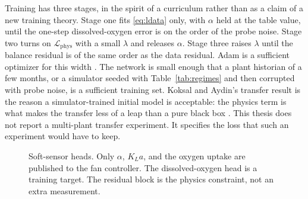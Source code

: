 Training has three stages, in the spirit of a curriculum rather than as a claim of a new training theory. Stage one fits \eqref{eq:ldata} only, with $\alpha$ held at the table value, until the one-step dissolved-oxygen error is on the order of the probe noise. Stage two turns on $\mathcal{L}_{\mathrm{phys}}$ with a small $\lambda$ and releases $\alpha$. Stage three raises $\lambda$ until the balance residual is of the same order as the data residual. Adam is a sufficient optimizer for this width \cite{kingma2015adam,goodfellow2016deep}. The network is small enough that a plant historian of a few months, or a simulator seeded with Table~\ref{tab:regimes} and then corrupted with probe noise, is a sufficient training set. Koksal and Aydin's transfer result is the reason a simulator-trained initial model is acceptable: the physics term is what makes the transfer less of a leap than a pure black box \cite{koksal2024,pan2010transfer}. This thesis does not report a multi-plant transfer experiment. It specifies the loss that such an experiment would have to keep.

\begin{figure}[ht]
\centering
{}
\caption{Soft-sensor heads. Only $\alpha$, $K_La$, and the oxygen uptake are published to the fan controller. The dissolved-oxygen head is a training target. The residual block is the physics constraint, not an extra measurement.}
\label{fig:pinn}
\end{figure}

